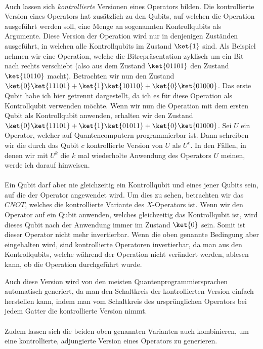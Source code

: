 \paragraph{}
Auch lassen sich \textit{kontrollierte} Versionen eines Operators bilden. Die kontrollierte Version eines Operators hat zusätzlich zu den Qubits, auf welchen die Operation ausgeführt werden soll, eine Menge an sogenannten Kontrollqubits als Argumente. Diese Version der Operation wird nur in denjenigen Zuständen ausgeführt, in welchen alle Kontrollqubits im Zustand $\ket{1}$ sind. Als Beispiel nehmen wir eine Operation, welche die Bitrepräsentation zyklisch um ein Bit nach rechts verschiebt (also aus dem Zustand $\ket{01101}$ den Zustand $\ket{10110}$ macht). Betrachten wir nun den Zustand $\ket{0}\ket{11101} + \ket{1}\ket{10110} + \ket{0}\ket{01000}$. Das erste Qubit habe ich hier getrennt dargestellt, da ich es für diese Operation als Kontrollqubit verwenden möchte. Wenn wir nun die Operation mit dem ersten Qubit als Kontrollqubit anwenden, erhalten wir den Zustand $\ket{0}\ket{11101} + \ket{1}\ket{01011} + \ket{0}\ket{01000}$. Sei $U$ ein Operator, welcher auf Quantencomputern programmierbar ist. Dann schreiben wir die durch das Qubit $c$ kontrollierte Version von $U$ als $U^c$. In den Fällen, in denen wir mit $U^k$ die $k$ mal wiederholte Anwendung des Operators $U$ meinen, werde ich darauf hinweisen.

\paragraph{}

Ein Qubit darf aber nie gleichzeitig ein Kontrollqubit und eines jener Qubits sein, auf die der Operator angewendet wird. Um dies zu sehen, betrachten wir das $CNOT$, welches die kontrollierte Variante des $X$-Operators ist. Wenn wir den Operator auf ein Qubit anwenden, welches gleichzeitig das Kontrollqubit ist, wird dieses Qubit nach der Anwendung immer im Zustand $\ket{0}$ sein. Somit ist dieser Operator nicht mehr invertierbar. Wenn die oben genannte Bedingung aber eingehalten wird, sind kontrollierte Operatoren invertierbar, da man aus den Kontrollqubits, welche während der Operation nicht verändert werden, ablesen kann, ob die Operation durchgeführt wurde.

Auch diese Version wird von den meisten Quantenprogrammiersprachen automatisch generiert, da man den Schaltkreis der kontrollierten Version einfach herstellen kann, indem man vom Schaltkreis des ursprünglichen Operators bei jedem Gatter die kontrollierte Version nimmt.

\paragraph{}

Zudem lassen sich die beiden oben genannten Varianten auch kombinieren, um eine kontrollierte, adjungierte Version eines Operators zu generieren. 